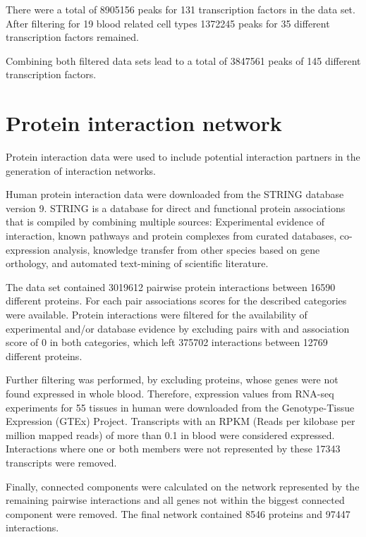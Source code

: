 \documentclass[a4paper,12pt,twoside,openright]{report}
\begin{document}
There were a total of 8905156 peaks for 131 transcription factors in the data set. After filtering for 19 blood related cell types 1372245 peaks for 35 different transcription factors remained.  

Combining both filtered data sets lead to a total of 3847561 peaks of 145 different transcription factors.

\section{Protein interaction network}
\label{Data:Protein interaction network}
Protein interaction data were used to include potential interaction partners in the generation of interaction networks.

Human protein interaction data were downloaded from the STRING database version 9\cite{Franceschini2013}. STRING is a database for direct and functional protein associations that is compiled by combining multiple sources: Experimental evidence of interaction, known pathways and protein complexes from curated databases, co-expression analysis, knowledge transfer from other species based on gene orthology, and automated text-mining of scientific literature\cite{Szklarczyk2017}. 

The data set contained 3019612 pairwise protein interactions between 16590 different proteins. For each pair associations scores for the described categories were available. Protein interactions were filtered for the availability of experimental and/or database evidence by excluding pairs with and association score of 0 in both categories, which left 375702 interactions between 12769 different proteins. 

Further filtering was performed, by excluding proteins, whose genes were not found expressed in whole blood. Therefore, expression values from RNA-seq experiments for 55 tissues in human were downloaded from the  Genotype-Tissue Expression (GTEx) Project\cite{GTExConsortium2013}. Transcripts with an RPKM (Reads per kilobase per million mapped reads) of more than 0.1 in blood were considered expressed. Interactions where one or both members were not represented by these 17343 transcripts were removed.

Finally, connected components were calculated on the network represented by the remaining pairwise interactions and all genes not within the biggest connected component were removed. The final network contained 8546 proteins and 97447 interactions. 
\end{document}
